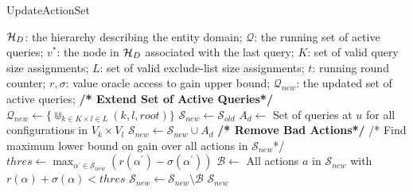 \begin{algorithm}[h]
\small\caption{UpdateActionSet}
\label{algo:updateactions}
\begin{algorithmic}[1]
 $\mathcal{H}_D$: the hierarchy describing the entity domain; $\mathcal{Q}$: the running set of active queries; $v^*$: the node in $\mathcal{H}_D$ associated with the last query; $K$: set of valid query size assignments; $L$: set of valid exclude-list size assignments; $t$: running round counter; $r,\sigma$: value oracle access to gain upper bound; 
 $\mathcal{Q}_{new}$: the updated set of active queries;
\STATE \textbf{/* Extend Set of Active Queries*/}
	\STATE $\mathcal{Q}_{new} \leftarrow \{ \Cup_{k \in K \times l \in L} (k,l,root) \}$ 
\ENDIF 
\STATE $\mathcal{S}_{new} \leftarrow \mathcal{S}_{old}$
\STATE $A_d \leftarrow$ Set of queries at $u$ for all configurations in $V_k \times V_l$
\STATE $\mathcal{S}_{new} \leftarrow \mathcal{S}_{new} \cup A_d$
\ENDFOR
\STATE \textbf{/* Remove Bad Actions*/}
\STATE /* Find maximum lower bound on gain over all actions in $\mathcal{S}_{new}$*/
\STATE $thres \leftarrow \max_{\alpha^{\prime} \in \mathcal{S}_{new}} (r(\alpha^{\prime}) - \sigma(\alpha^{\prime}))$  
\STATE $\mathcal{B} \leftarrow$ All actions $a$ in $\mathcal{S}_{new}$ with $r(\alpha) + \sigma(\alpha) < thres$
\STATE $\mathcal{S}_{new} \leftarrow \mathcal{S}_{new} \setminus \mathcal{B}$
\RETURN $\mathcal{S}_{new}$
\end{algorithmic}
\end{algorithm}
\vspace{-5pt}
